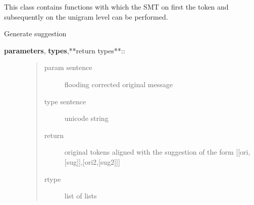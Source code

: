 \documentclass[letterpaper,10pt,english]{sphinxmanual}
\begin{document}
\begin{fulllineitems}
\label{API:norm.modules.smt.SMT_Cascaded}
This class contains functions with which the SMT on first the token 
and subsequently on the unigram level can be performed.

\begin{fulllineitems}
\label{API:norm.modules.smt.SMT_Cascaded.generate_alternatives}
Generate suggestion
\begin{description}
\item[{\textbf{parameters}, \textbf{types},**return types**::}] \leavevmode\begin{quote}\begin{description}
\item[{param sentence}] \leavevmode
flooding corrected original message

\item[{type sentence}] \leavevmode
unicode string

\item[{return}] \leavevmode
original tokens aligned with the suggestion of the form {[}{[}ori,{[}sug{]}{]},{[}ori2,{[}sug2{]}{]}{]}

\item[{rtype}] \leavevmode
list of lists

\end{description}\end{quote}

\end{description}

\end{fulllineitems}


\end{fulllineitems}

\end{document}
